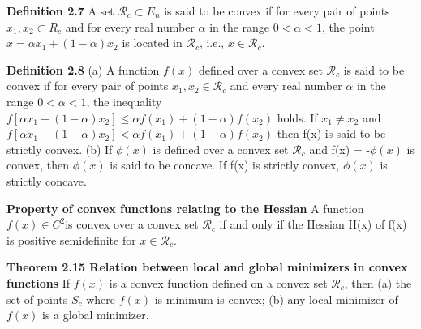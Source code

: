 \begin{multicols}{3}
\textbf{Definition 2.7} \newline
A set $\mathcal{R}_c
\subset E_n $ is said to be convex if for every pair of points $x_1, x_2 \subset R_c$
and for every real number $\alpha$ in the range $0 < \alpha < 1$, the point
$x = \alpha x_1 + (1 - \alpha)x_2$
is located in $\mathcal{R}_c
$, i.e., $x \in \mathcal{R}_c$. \newline 

\textbf{Definition 2.8} \newline
(a) A function $f(x)$ defined over a convex set $\mathcal{R}_c$  is said to be convex if for
every pair of points $x_1, x_2 \in \mathcal{R}_c $ and every real number $\alpha$ in the range $0 < \alpha < 1$, the inequality
$f[\alpha x_1 + (1 - \alpha)x_2] \leq \alpha f(x_1) + (1 - \alpha)f(x_2)$ 
holds. If $x_1 \neq x_2$ and
$f[\alpha x_1 + (1 - \alpha)x_2] < \alpha f(x_1) + (1 - \alpha)f(x_2)$
then f(x) is said to be strictly convex. \newline
(b) If $\phi(x)$ is defined over a convex set $\mathcal{R}_c$ and f(x) = -$\phi(x)$ is convex, then $\phi(x)$ is said to be concave. If f(x) is strictly convex, $\phi(x)$ is strictly concave. \newline

\textbf{Property of convex functions relating to the Hessian} A function $f(x) \in C^2$is convex over a convex set 
$\mathcal{R}_c$ if and only if the Hessian H(x) of
f(x) is positive semidefinite for $x \in \mathcal{R}_c.$  \newline 

\textbf{Theorem 2.15 Relation between local and global minimizers in convex functions} \newline 
If $f(x)$ is a convex function defined on a convex set $\mathcal{R}_c$, then  \newline 
(a) the set of points $S_c$ where $f(x)$ is minimum is convex;  \newline 
(b) any local minimizer of $f(x)$ is a global minimizer. 


\end{multicols}
